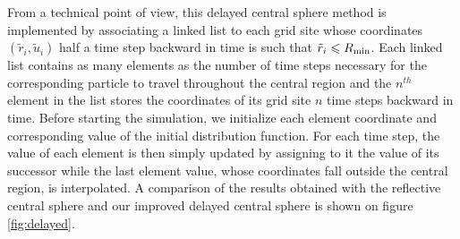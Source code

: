 \documentclass[useAMS,usenatbib]{mn2e}
\newcommand{\rtilde}{\tilde{r}}
\newcommand{\utilde}{\tilde{u}}
\begin{document}
From a technical point of view, this delayed central sphere method is implemented by associating a linked list to each grid site whose coordinates $\left(\rtilde_i,\utilde_i\right)$ half a time step backward in time is such that $\rtilde_i\leq R_{\rm min}$. Each linked list contains as many elements as the number of time steps necessary for the corresponding particle to travel throughout the central region and the $n^{th}$ element in the list stores the coordinates of its grid site $n$ time steps backward in time. Before starting the simulation, we initialize each element coordinate and corresponding value of the initial distribution function. For each time step, the value of each element is then simply updated by assigning to it the value of its successor while the last element value, whose coordinates fall outside the central region, is interpolated. A comparison of the results obtained with the reflective central sphere and our improved delayed central sphere is shown on figure \ref{fig:delayed}.\\
\end{document}
